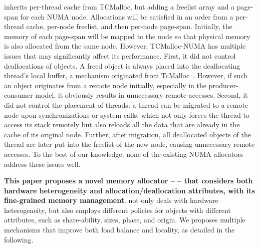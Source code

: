 \TN{} inherits per-thread cache from TCMalloc, but adding a freelist array and a page-span for each NUMA node. Allocations will be satisfied in an order from a per-thread cache, per-node freelist, and then per-node page-span. Initially, the memory of each page-span will be mapped to the node so that physical memory is also allocated from the same node. However, TCMalloc-NUMA has multiple issues that may significantly affect its performance. First, it did not control deallocations of objects. A freed object is always placed into the deallocating thread's local buffer, a mechanism originated from TcMalloc~\citep{tcmalloc}. However, if such an object originates from a remote node initially, especially in the producer-consumer model, it obviously results in unnecessary remote accesses. Second, it did not control the placement of threads: a thread can be migrated to a remote node upon synchronizations or system calls, which not only forces the thread to access its stack remotely but also reloads all the data that are already in the cache of its original node. Further, after migration, all deallocated objects of the thread are later put into the freelist of the new node, causing unnecessary remote accesses. To the best of our knowledge, none of the existing NUMA allocators address these issues well.

\textbf{This paper proposes a novel memory allocator -- \NM{} -- that considers both hardware heterogeneity and allocation/deallocation attributes, with its fine-grained memory management}. \NM{} not only deals with hardware heterogeneity, but also employs different policies for objects with different attributes, such as share-ability, sizes, phase, and origin. We proposes multiple mechanisms that improve both load balance and locality, as detailed in the following.   


